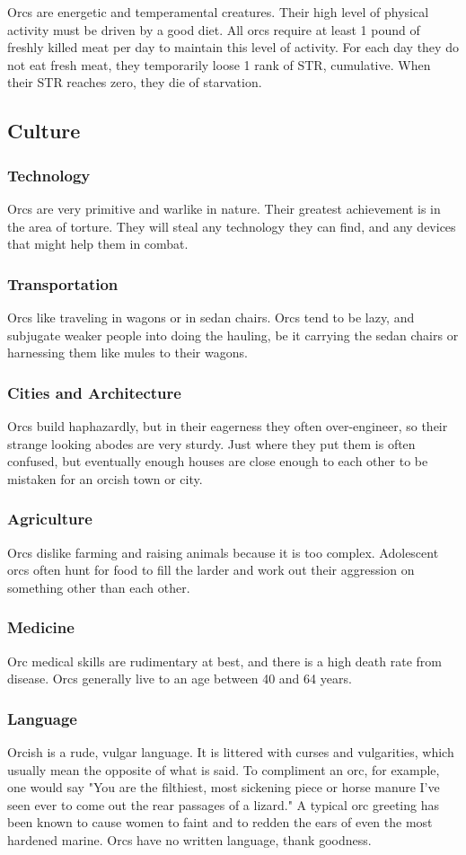 \begin{multicols*}{2}
Orcs are energetic and temperamental creatures. Their high level of physical activity must be driven by a good diet. All orcs require at least 1 pound of freshly killed meat per day to maintain this level of activity. For each day they do not eat fresh meat, they temporarily loose 1 rank of STR, cumulative. When their STR reaches zero, they die of starvation.
\subsection{Culture}
\subsubsection{Technology}
Orcs are very primitive and warlike in nature. Their greatest achievement is in the area of torture. They will steal any technology they can find, and any devices that might help them in combat.
\subsubsection{Transportation}
Orcs like traveling in wagons or in sedan chairs. Orcs tend to be lazy, and subjugate weaker people into doing the hauling, be it carrying the sedan chairs or harnessing them like mules to their wagons.
\subsubsection{Cities and Architecture}
Orcs build haphazardly, but in their eagerness they often over-engineer, so their strange looking abodes are very sturdy. Just where they put them is often confused, but eventually enough houses are close enough to each other to be mistaken for an orcish town or city.
\subsubsection{Agriculture}
Orcs dislike farming and raising animals because it is too complex. Adolescent orcs often hunt for food to fill the larder and work out their aggression on something other than each other.
\subsubsection{Medicine}
Orc medical skills are rudimentary at best, and there is a high death rate from disease. Orcs generally live to an age between 40 and 64 years.
\subsubsection{Language}
Orcish is a rude, vulgar language. It is littered with curses and vulgarities, which usually mean the opposite of what is said. To compliment an orc, for example, one would say "You are the filthiest, most sickening piece or horse manure I've seen ever to come out the rear passages of a lizard." A typical orc greeting has been known to cause women to faint and to redden the ears of even the most hardened marine. Orcs have no written language, thank goodness.

\end{multicols*}
